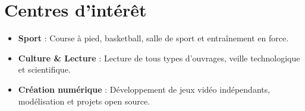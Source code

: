 \documentclass[10pt,a4paper]{article}
\begin{document}
\section{Centres d'intérêt}
\begin{itemize}
  \item \textbf{Sport} : Course à pied, basketball, salle de sport et entraînement en force.
  \item \textbf{Culture \& Lecture} : Lecture de tous types d'ouvrages, veille technologique et scientifique.
  \item \textbf{Création numérique} : Développement de jeux vidéo indépendants, modélisation et projets open source.
\end{itemize}
\end{document}
